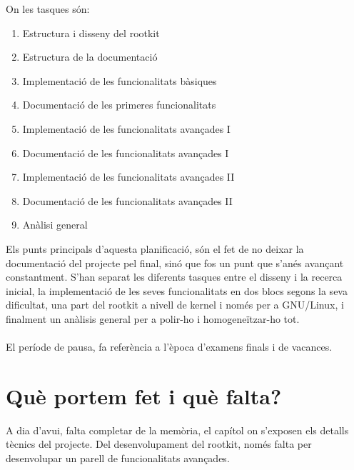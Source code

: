 \documentclass[a4paper]{article}
\begin{document}
On les tasques són:
\begin{enumerate}
    \item Estructura i disseny del rootkit
    \item Estructura de la documentació
    \item Implementació de les funcionalitats bàsiques
    \item Documentació de les primeres funcionalitats
    \item Implementació de les funcionalitats avançades I
    \item Documentació de les funcionalitats avançades I
    \item Implementació de les funcionalitats avançades II
    \item Documentació de les funcionalitats avançades II
    \item Anàlisi general
\end{enumerate}

Els punts principals d'aquesta planificació, són el fet de no deixar la documentació del projecte pel final,
sinó que fos un punt que s'anés avançant constantment. S'han separat les diferents tasques entre el disseny
i la recerca inicial, la implementació de les seves funcionalitats en dos blocs segons la seva dificultat,
una part del rootkit a nivell de kernel i només per a GNU/Linux, i finalment un anàlisis general per a polir-ho
i homogeneïtzar-ho tot. \\
\\
El període de pausa, fa referència a l'època d'examens finals i de vacances.

\section{Què portem fet i què falta?}

A dia d'avui, falta completar de la memòria, el capítol on s'exposen els detalls tècnics del projecte. Del 
desenvolupament del rootkit, només falta per desenvolupar un parell de funcionalitats avançades.
\end{document}
